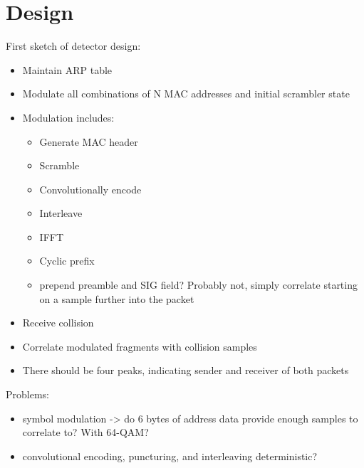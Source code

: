 
\chapter{Design}\label{ch:design}

\glsresetall %


First sketch of detector design:

\begin{itemize}
	\item Maintain ARP table
	\item Modulate all combinations of N MAC addresses and initial scrambler state
	\item Modulation includes:
	\begin{itemize}
		\item Generate MAC header
		\item Scramble
		\item Convolutionally encode
		\item Interleave
		\item IFFT
		\item Cyclic prefix
		\item prepend preamble and SIG field? Probably not, simply correlate starting on a sample further into the packet
	\end{itemize}
	\item Receive collision
	\item Correlate modulated fragments with collision samples
	\item There should be four peaks, indicating sender and receiver of both packets
\end{itemize}

Problems:

\begin{itemize}
	\item symbol modulation -> do 6 bytes of address data provide enough samples to correlate to? With 64-QAM?
	\item convolutional encoding, puncturing, and interleaving deterministic?
\end{itemize}